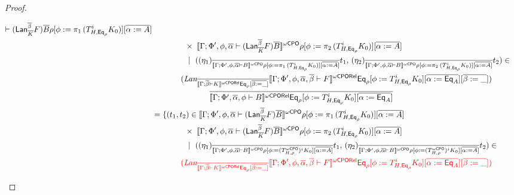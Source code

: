 \documentclass[acmsmall,review,anonymous]{acmart}
\theoremstyle{definition}
\begin{document}
\begin{proof}
\begin{itemize}
\begin{itemize}
{\begin{align*}
{    \vdash (\Lan_{\ol K}^{\ol \beta} F)\ol{B}} \rho [\phi := \pi_1\,
    (T^i_{H,\Eq_{\rho}} K_0)] [\overline{\alpha := A}]\\
& \hspace*{0.57in}\times\;
  \oCPOsem{\Gamma;\Phi',\phi,\ol\alpha \vdash (\Lan_{\ol
      K}^{\ol \beta} F)\ol{B}} \rho [\phi := \pi_2\,
    (T^i_{H,\Eq_{\rho}} K_0)] [\overline{\alpha := A}]\\
& \hspace*{0.63in}|~\;((\eta_1)_{\ol{\oCPOsem{\Gamma;\Phi',\phi,\ol\alpha
      \vdash B}\rho [\phi := \pi_1\, 
    (T^i_{H,\Eq_{\rho}} K_0)] [\overline{\alpha := A}]}} t_1,\,
  (\eta_2)_{\ol{\oCPOsem{\Gamma;\Phi',\phi,\ol\alpha
      \vdash B}\rho [\phi := \pi_2\,
    (T^i_{H,\Eq_{\rho}} K_0)] [\overline{\alpha := A}]}} t_2) \in\\
& \hspace*{0.5in}(\textit{Lan}_{\ol{\oCPORsem{\Gamma; \ol\beta 
        \vdash K}\Eq_\rho[\ol{\beta := \_}]}}
  \oCPORsem{\Gamma; \Phi',\phi,
    \ol\alpha,\ol\beta \vdash F}\Eq_\rho[\phi := T^i_{H,\Eq_{\rho}} K_0][\ol{\alpha
      := \Eq_A}][\ol{\beta := \_}])\\
&\hspace*{1in}\ol{\oCPORsem{\Gamma; \Phi',
    \ol\alpha,\phi\vdash B}\Eq_\rho[\phi := T^i_{H,\Eq_{\rho}} K_0][\ol{\alpha
          := \Eq_A}]}\\
&= \{(t_1,t_2) \in \oCPOsem{\Gamma;\Phi',\phi,\ol\alpha
    \vdash (\Lan_{\ol K}^{\ol \beta} F)\ol{B}} \rho [\phi := \pi_1\,
    (T^i_{H,\Eq_{\rho}} K_0)] [\overline{\alpha := A}]\\
& \hspace*{0.57in}\times\;
  \oCPOsem{\Gamma;\Phi',\phi,\ol\alpha \vdash (\Lan_{\ol
      K}^{\ol \beta} F)\ol{B}} \rho [\phi := \pi_2\,
    (T^i_{H,\Eq_{\rho}} K_0)] [\overline{\alpha := A}]\\
& \hspace*{0.63in}|~\;((\eta_1)_{\ol{\oCPOsem{\Gamma;\Phi',\phi,\ol\alpha
      \vdash B}\rho [\phi := (T^\oCPO_{H,\rho})^i
     K_0] [\overline{\alpha := A}]}} t_1,\,
  (\eta_2)_{\ol{\oCPOsem{\Gamma;\Phi',\phi,\ol\alpha
      \vdash B}\rho [\phi := (T^\oCPO_{H,\rho})^i
    K_0] [\overline{\alpha := A}]}} t_2) \in\\
& \hspace*{0.5in}{\color{red} (\textit{Lan}_{\ol{\oCPORsem{\Gamma; \ol\beta 
        \vdash K}\Eq_\rho[\ol{\beta := \_}]}}
  \oCPORsem{\Gamma; \Phi',\phi,
    \ol\alpha,\ol\beta \vdash F}\Eq_\rho[\phi := T^i_{H,\Eq_{\rho}} K_0][\ol{\alpha
      := \Eq_A}][\ol{\beta := \_}])}\\

\end{align*}}
\end{itemize}
\end{itemize}
\end{proof}
\end{document}
